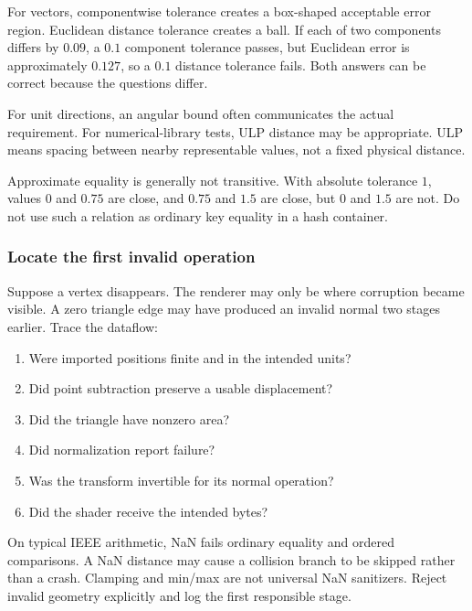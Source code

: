 For vectors, componentwise tolerance creates a box-shaped acceptable error region. Euclidean distance tolerance creates a ball. If each of two components differs by \(0.09\), a \(0.1\) component tolerance passes, but Euclidean error is approximately \(0.127\), so a \(0.1\) distance tolerance fails. Both answers can be correct because the questions differ.

For unit directions, an angular bound often communicates the actual requirement. For numerical-library tests, ULP distance may be appropriate. ULP means spacing between nearby representable values, not a fixed physical distance.

Approximate equality is generally not transitive. With absolute tolerance \(1\), values \(0\) and \(0.75\) are close, and \(0.75\) and \(1.5\) are close, but \(0\) and \(1.5\) are not. Do not use such a relation as ordinary key equality in a hash container.

\subsubsection{Locate the first invalid operation}\label{02-foundations-ii-ch037-locate-the-first-invalid-operation}

Suppose a vertex disappears. The renderer may only be where corruption became visible. A zero triangle edge may have produced an invalid normal two stages earlier. Trace the dataflow:

\begin{enumerate}
\def\labelenumi{\arabic{enumi}.}
\tightlist
\item
  Were imported positions finite and in the intended units?
\item
  Did point subtraction preserve a usable displacement?
\item
  Did the triangle have nonzero area?
\item
  Did normalization report failure?
\item
  Was the transform invertible for its normal operation?
\item
  Did the shader receive the intended bytes?
\end{enumerate}

On typical IEEE arithmetic, NaN fails ordinary equality and ordered comparisons. A NaN distance may cause a collision branch to be skipped rather than a crash. Clamping and min/max are not universal NaN sanitizers. Reject invalid geometry explicitly and log the first responsible stage.

